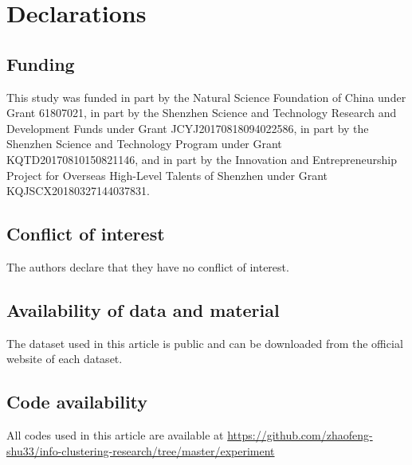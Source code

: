 \section{Declarations}
\subsection{Funding}
This study was funded in part by the Natural Science Foundation of China under Grant 61807021, in part by the Shenzhen Science and Technology Research and Development Funds under Grant  JCYJ20170818094022586, in part by the Shenzhen Science and Technology Program under Grant \linebreak[4] KQTD20170810150821146, and in part by the Innovation and Entrepreneurship Project for Overseas High-Level Talents of Shenzhen under Grant \linebreak[4] KQJSCX20180327144037831.
\subsection{Conflict of interest}
The authors declare that they have no conflict of interest.
\subsection{Availability of data and material}
The dataset used in this article is public and can be downloaded from the official website of each dataset.
\subsection{Code availability}
All codes used in this article are available at \url{https://github.com/zhaofeng-shu33/info-clustering-research/tree/master/experiment}

%
%
\appendix
